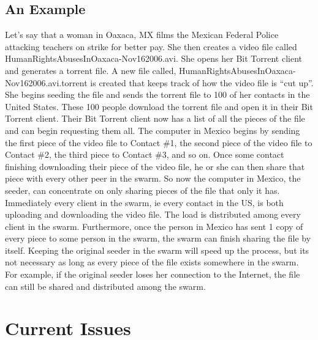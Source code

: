 \documentclass[a4paper,12pt]{report}
\begin{document}
\section{An Example}
Let’s say that a woman in Oaxaca, MX films the Mexican Federal Police attacking teachers on strike for better pay. 
She then creates a video file called HumanRightsAbusesInOaxaca-Nov162006.avi. She opens her Bit Torrent client and generates a torrent file. 
A new file called, HumanRightsAbusesInOaxaca-Nov162006.avi.torrent is created that keeps track of how the video file is “cut up”. 
She begins seeding the file and sends the torrent file to 100 of her contacts in the United States.
These 100 people download the torrent file and open it in their Bit Torrent client. 
Their Bit Torrent client now has a list of all the pieces of the file and can begin requesting them all. 
The computer in Mexico begins by sending the first piece of the video file to Contact \#1, the second piece of the video file to Contact \#2, the third piece to Contact \#3, and so on. 
Once some contact finishing downloading their piece of the video file, he or she can then share that piece with every other peer in the swarm. 
So now the computer in Mexico, the seeder, can concentrate on only sharing pieces of the file that only it has. 
Immediately every client in the swarm, ie every contact in the US, is both uploading and downloading the video file. 
The load is distributed among every client in the swarm. 
Furthermore, once the person in Mexico has sent 1 copy of every piece to some person in the swarm, the swarm can finish sharing the file by itself. 
Keeping the original seeder in the swarm will speed up the process, but its not necessary as long as every piece of the file exists somewhere in the swarm. 
For example, if the original seeder loses her connection to the Internet, the file can still be shared and distributed among the swarm. 

\chapter{Current Issues}
\end{document}
